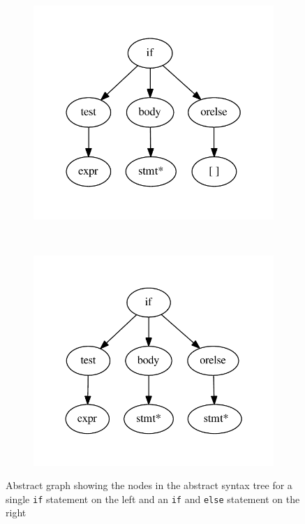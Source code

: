 \begin{figure}
    \begin{subfigure}[b]{0.45\textwidth}
        \includegraphics[width=\textwidth]{./figures/dot_files/if_ast.pdf}
    \end{subfigure}
    ~ %
    \begin{subfigure}[b]{0.45\textwidth}
        \includegraphics[width=\textwidth]{./figures/dot_files/if_else.pdf}
    \end{subfigure}
    \caption{Abstract graph showing the nodes in the abstract syntax tree for a single \texttt{if} statement on the left and an \texttt{if} and \texttt{else} statement on the right}
    \label{test:ast:if_and_else}
\end{figure}

